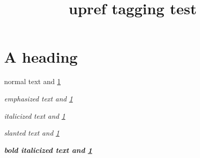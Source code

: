\documentclass{article}
\title{upref tagging test}
\begin{document}
\section{A heading}
\label{blub}

normal text and \ref{blub}

\emph{emphasized text and \ref{blub}}

{\itshape italicized text and \ref{blub}}

\textsl{slanted text and \ref{blub}}

\textbf{\textit{bold italicized text and \ref{blub}}}
\end{document}
